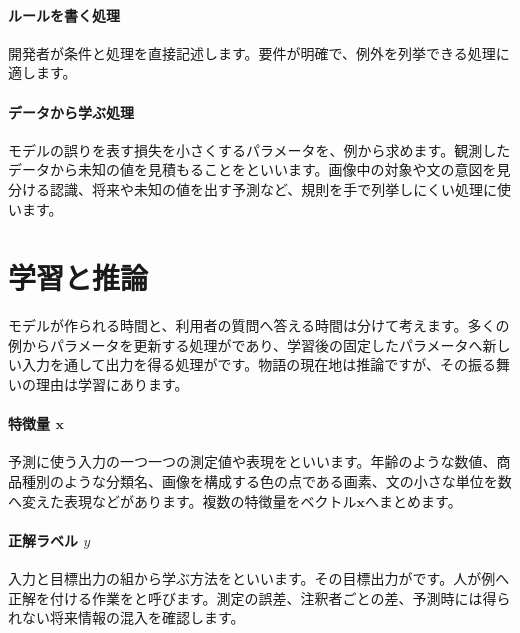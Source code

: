 \paragraph{ルールを書く処理}
        開発者が条件と処理を直接記述します。要件が明確で、例外を列挙できる処理に適します。

\par
\endgroup
\medskip
\begingroup
\paragraph{データから学ぶ処理}
        モデルの誤りを表す損失を小さくするパラメータを、例から求めます。観測したデータから未知の値を見積もることをといいます。画像中の対象や文の意図を見分ける認識、将来や未知の値を出す予測など、規則を手で列挙しにくい処理に使います。

\par
\endgroup
\par
\endgroup


\section{学習と推論}
\label{sec:06-machine-learning-05}

モデルが作られる時間と、利用者の質問へ答える時間は分けて考えます。多くの例からパラメータを更新する処理がであり、学習後の固定したパラメータへ新しい入力を通して出力を得る処理がです。物語の現在地は推論ですが、その振る舞いの理由は学習にあります。

\begingroup
\begingroup
\paragraph{特徴量 $\mathbf{x}$}
        予測に使う入力の一つ一つの測定値や表現をといいます。年齢のような数値、商品種別のような分類名、画像を構成する色の点である画素、文の小さな単位を数へ変えた表現などがあります。複数の特徴量をベクトル$\mathbf{x}$へまとめます。

\paragraph{正解ラベル $y$}
        入力と目標出力の組から学ぶ方法をといいます。その目標出力がです。人が例へ正解を付ける作業をと呼びます。測定の誤差、注釈者ごとの差、予測時には得られない将来情報の混入を確認します。

